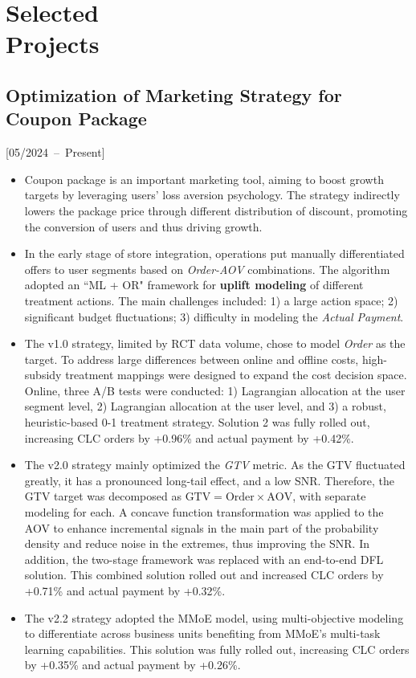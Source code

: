 \documentclass{mycv}
\begin{document}

\section{Selected \\ Projects}

\subsection{Optimization of Marketing Strategy for Coupon Package}[05/2024~--~Present]

\begin{itemize}
  \itemsep 0.3em
  \item Coupon package is an important marketing tool, aiming to boost growth targets by leveraging users' loss aversion psychology. The strategy indirectly lowers the package price through different distribution of discount, promoting the conversion of users and thus driving growth.
  \item In the early stage of store integration\footnotemark[2], operations put manually differentiated offers to user segments based on \textit{Order-AOV} combinations. The algorithm adopted an ``ML + OR" framework for \textbf{uplift modeling} of different treatment actions. The main challenges included: 1) a large action space; 2) significant budget fluctuations; 3) difficulty in modeling the \textit{Actual Payment}.
  \item The v1.0 strategy, limited by RCT data volume, chose to model \textit{Order} as the target. To address large differences between online and offline costs, high-subsidy treatment mappings were designed to expand the cost decision space. Online, three A/B tests were conducted: 1) Lagrangian allocation at the user segment level, 2) Lagrangian allocation at the user level, and 3) a robust, heuristic-based 0-1 treatment strategy. Solution 2 was fully rolled out, increasing CLC orders by +0.96\% and actual payment by +0.42\%.
  \item The v2.0 strategy mainly optimized the \textit{GTV} metric. As the GTV fluctuated greatly, it has a pronounced long-tail effect, and a low SNR. Therefore, the GTV target was decomposed as $\text{GTV} = \text{Order} \times \text{AOV}$, with separate modeling for each. A concave function transformation was applied to the AOV to enhance incremental signals in the main part of the probability density and reduce noise in the extremes, thus improving the SNR. In addition, the two-stage framework was replaced with an end-to-end DFL solution. This combined solution rolled out and increased CLC orders by +0.71\% and actual payment by +0.32\%.
  \item The v2.2 strategy adopted the MMoE model, using multi-objective modeling to differentiate across business units benefiting from MMoE's multi-task learning capabilities. This solution was fully rolled out, increasing CLC orders by +0.35\% and actual payment by +0.26\%.
\end{itemize}
\end{document}
